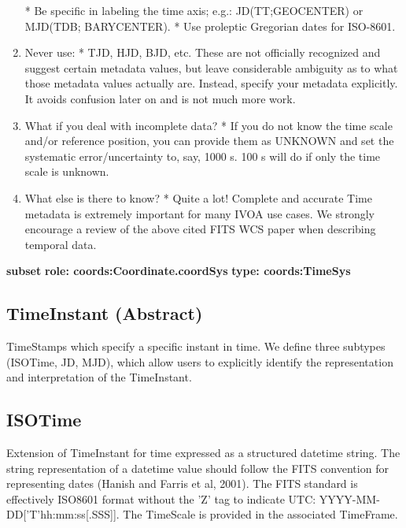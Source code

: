 \begin{enumerate}
     * Be specific in labeling the time axis; e.g.: JD(TT;GEOCENTER) or MJD(TDB; BARYCENTER).  \newline
     * Use proleptic Gregorian dates for ISO-8601.
    \item Never use:  \newline
     * TJD, HJD, BJD, etc. These are not officially recognized and suggest certain metadata values, but leave considerable ambiguity as to what those metadata values actually are. Instead, specify your metadata explicitly. It avoids confusion later on and is not much more work.
    \item What if you deal with incomplete data?  \newline
     * If you do not know the time scale and/or reference position, you can provide them as UNKNOWN and set the systematic error/uncertainty to, say, 1000 s. 100 s will do if only the time scale is unknown.
    \item What else is there to know?  \newline
     * Quite a lot! Complete and accurate Time metadata is extremely important for many IVOA use cases. We strongly encourage a review of the above cited FITS WCS paper when describing temporal data.\newline
    \end{enumerate}

    \noindent \textbf{subset} \newline
    \indent   \textbf{role: coords:Coordinate.coordSys} \newline
    \indent   \textbf{type: coords:TimeSys} \newline

  \subsection{TimeInstant (Abstract)}
  \label{sect:TimeInstant}
    TimeStamps which specify a specific instant in time. We define three subtypes (ISOTime, JD, MJD), which allow users to explicitly identify the representation and interpretation of the TimeInstant.

  \subsection{ISOTime}
  \label{sect:ISOTime}
    Extension of TimeInstant for time expressed as a structured datetime string. The string representation of a datetime value should follow the FITS convention for representing dates (Hanish and Farris et al, 2001). The FITS standard is effectively ISO8601 format without the 'Z' tag to indicate UTC: YYYY-MM-DD['T'hh:mm:ss[.SSS]]. The TimeScale is provided in the associated TimeFrame.

